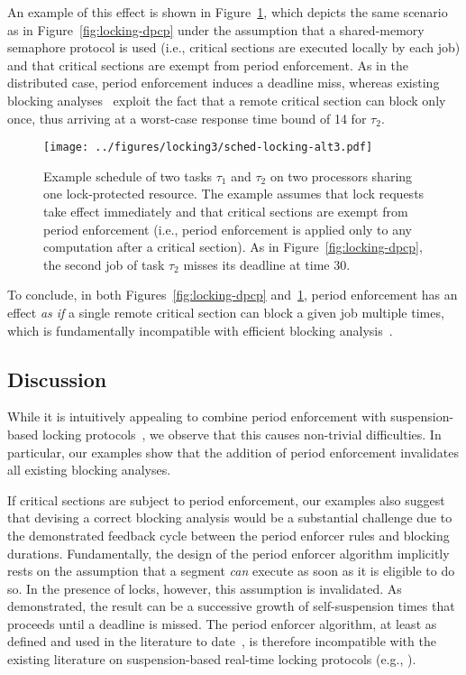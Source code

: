 An example of this effect is shown in  Figure~\ref{fig:locking-alt3}, which depicts the same scenario as in Figure~\ref{fig:locking-dpcp} under the assumption that a shared-memory semaphore protocol is used (i.e., critical sections are executed locally by each job) and that critical sections are exempt from period enforcement. As in the distributed case, period enforcement induces a deadline miss, whereas existing blocking analyses~\cite{Br:13,LNR:09} exploit the fact that a remote critical section can block only once, thus arriving at a worst-case response time bound of 14 for $\tau_2$.

\begin{figure}[t]
  \centering
  \texttt{[image: ../figures/locking3/sched-locking-alt3.pdf]}
  \caption{Example schedule of two tasks $\tau_1$ and $\tau_2$ on two processors sharing one lock-protected resource. The example assumes that lock requests take effect immediately and that critical sections are exempt from period enforcement (i.e., period enforcement is applied only to any computation after a critical section). As in Figure~\ref{fig:locking-dpcp}, the second job of task $\tau_2$ misses its deadline at time $30$.
  }
  \label{fig:locking-alt3}
\end{figure}

To conclude, in both Figures~\ref{fig:locking-dpcp} and~\ref{fig:locking-alt3}, period enforcement has an effect  \emph{as if} a single remote critical section can block a given job multiple times, which is fundamentally incompatible with efficient blocking analysis~\cite{Br:13}.

\subsection{Discussion}

While it is intuitively appealing to combine period enforcement with suspension-based locking protocols~\cite{Raj:91,Lak:11,LNR:09}, we observe that this causes non-trivial difficulties. In particular, our examples show that the addition of period enforcement invalidates all existing blocking analyses. 


If critical sections are subject to period enforcement, our examples also suggest that devising a correct blocking analysis would be a substantial challenge due to the demonstrated feedback cycle between the period enforcer rules and blocking durations. Fundamentally, the design of the period enforcer algorithm implicitly rests on the assumption that a segment \emph{can} execute as soon as it is eligible to do so. In the presence of locks, however, this assumption is invalidated. As demonstrated, the result can be a successive growth of self-suspension times that proceeds until a deadline is missed.  The period enforcer algorithm, at least as defined and used in the literature to date~\cite{Raj:suspension1991,Raj:91}, is therefore incompatible with the existing literature on suspension-based real-time locking protocols (e.g., \cite{Raj:91,Lak:11,LNR:09,BLBA:07,Br:13}). 

